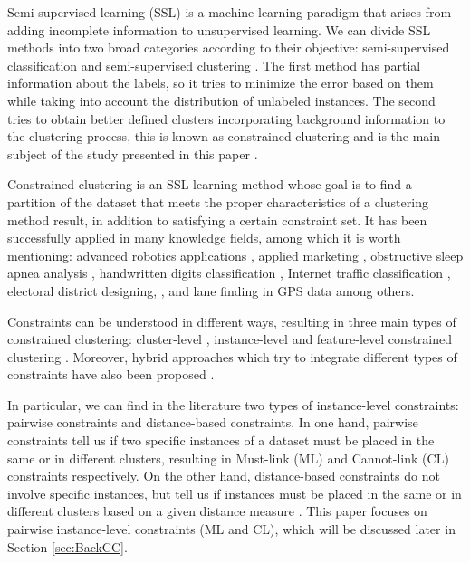 \documentclass[review]{elsarticle}
\begin{document}
Semi-supervised learning (SSL) is a machine learning paradigm that arises from adding incomplete information to unsupervised learning. We can divide SSL methods into two broad categories according to their objective: semi-supervised classification and semi-supervised clustering \cite{chapelle2009semi}. The first method has partial information about the labels, so it tries to minimize the error based on them while taking into account the distribution of unlabeled instances. The second tries to obtain better defined clusters incorporating background information to the clustering process, this is known as constrained clustering and is the main subject of the study presented in this paper \cite{triguero2015self}. 

Constrained clustering is an SSL learning method whose goal is to find a partition of the dataset that meets the proper characteristics of a clustering method result, in addition to satisfying a certain constraint set. It has been successfully applied in many knowledge fields, among which it is worth mentioning: advanced robotics applications \cite{davidson2005clustering, semnani2016constrained}, applied marketing \cite{seret2014new}, obstructive sleep apnea analysis \cite{mai2018evolutionary}, handwritten digits classification \cite{li2015scalable}, Internet traffic classification \cite{wang2014internet}, electoral district designing, \cite{brieden2017constrained}, and lane finding in GPS data \cite{wagstaff2001constrained} among others.

Constraints can be understood in different ways, resulting in three main types of constrained clustering: cluster-level \cite{bradley2000constrained}, instance-level \cite{davidson2007survey} and feature-level constrained clustering \cite{schmidt2011clustering}. Moreover, hybrid approaches which try to integrate different types of constraints have also been proposed \cite{wang2010clustering}. 

In particular, we can find in the literature two types of instance-level constraints: pairwise constraints and distance-based constraints. In one hand, pairwise constraints tell us if two specific instances of a dataset must be placed in the same or in different clusters, resulting in Must-link (ML) and Cannot-link (CL) constraints respectively. On the other hand, distance-based constraints do not involve specific instances, but tell us if instances must be placed in the same or in different clusters based on a given distance measure \cite{davidson2007survey}. This paper focuses on pairwise instance-level constraints (ML and CL), which will be discussed later in Section \ref{sec:BackCC}.
\end{document}
